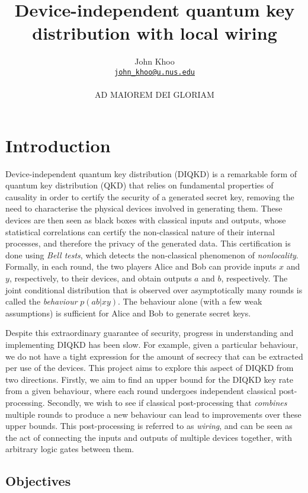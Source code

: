 \documentclass[10pt, a4paper]{article}
\title{Device-independent quantum key distribution with local wiring}
\author{John Khoo\\ \href{mailto:john_khoo@u.nus.edu}{\texttt{john\_khoo@u.nus.edu}} \\\\ AD MAIOREM DEI GLORIAM}
\numberwithin{equation}{section} %
\theoremstyle{definition}
\theoremstyle{plain}
\newcommand{\?}{\mathrel{?}} %
\begin{document}
  \maketitle

  \section{Introduction}

  Device-independent quantum key distribution (DIQKD) is a remarkable form of quantum key distribution (QKD) that relies on fundamental properties of causality in order to certify the security of a generated secret key, removing the need to characterise the physical devices involved in generating them. These devices are then seen as black boxes with classical inputs and outputs, whose statistical correlations can certify the non-classical nature of their internal processes, and therefore the privacy of the generated data. This certification is done using \emph{Bell tests}, which detects the non-classical phenomenon of \emph{nonlocality}. Formally, in each round, the two players Alice and Bob can provide inputs \(x\) and \(y\), respectively, to their devices, and obtain outputs \(a\) and \(b\), respectively. The joint conditional distribution that is observed over asymptotically many rounds is called the \emph{behaviour} \(p(ab|xy)\). The behaviour alone (with a few weak assumptions) is sufficient for Alice and Bob to generate secret keys.

  Despite this extraordinary guarantee of security, progress in understanding and implementing DIQKD has been slow. For example, given a particular behaviour, we do not have a tight expression for the amount of secrecy that can be extracted per use of the devices. This project aims to explore this aspect of DIQKD from two directions. Firstly, we aim to find an upper bound for the DIQKD key rate from a given behaviour, where each round undergoes independent classical post-processing. Secondly, we wish to see if classical post-processing that \emph{combines} multiple rounds to produce a new behaviour can lead to improvements over these upper bounds. This post-processing is referred to as \emph{wiring}, and can be seen as the act of connecting the inputs and outputs of multiple devices together, with arbitrary logic gates between them.

  \subsection{Objectives}
\end{document}
